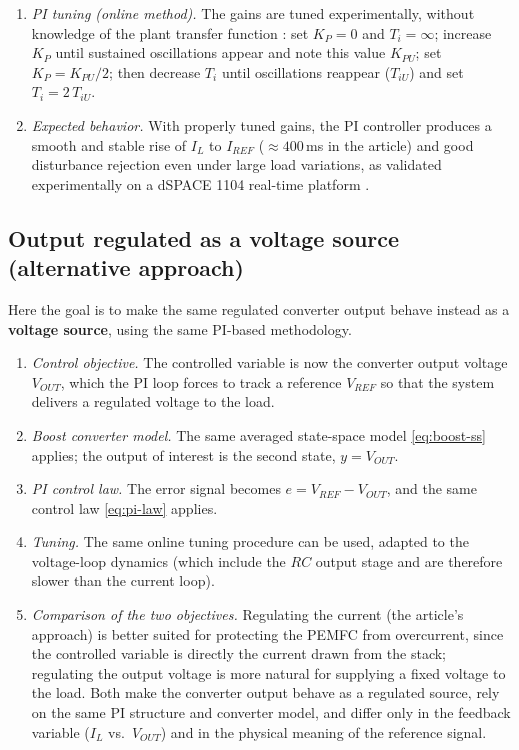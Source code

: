 \documentclass[11pt,a4paper]{article}
\begin{document}
\begin{enumerate}[itemsep=2pt]
          are too aggressive.
    \item \emph{PI tuning (online method).} The gains are tuned experimentally,
          without knowledge of the plant transfer function \cite{derbeli2017}:
          set $K_P=0$ and $T_i=\infty$; increase $K_P$ until sustained
          oscillations appear and note this value $K_{PU}$; set
          $K_P = K_{PU}/2$; then decrease $T_i$ until oscillations reappear
          ($T_{iU}$) and set $T_i = 2\,T_{iU}$.
    \item \emph{Expected behavior.} With properly tuned gains, the PI controller
          produces a smooth and stable rise of $I_L$ to $I_{REF}$
          ($\approx 400$\,ms in the article) and good disturbance rejection even
          under large load variations, as validated experimentally on a dSPACE
          1104 real-time platform \cite{derbeli2017}.
\end{enumerate}

\subsection{Output regulated as a voltage source (alternative approach)}
\label{sec:control-voltage}

Here the goal is to make the same regulated converter output behave instead as a
\textbf{voltage source}, using the same PI-based methodology.

\begin{enumerate}[itemsep=2pt]
    \item \emph{Control objective.} The controlled variable is now the converter
          output voltage $V_{OUT}$, which the PI loop forces to track a reference
          $V_{REF}$ so that the system delivers a regulated voltage to the load.
    \item \emph{Boost converter model.} The same averaged state-space model
          \eqref{eq:boost-ss} applies; the output of interest is the second
          state, $y = V_{OUT}$.
    \item \emph{PI control law.} The error signal becomes
          $e = V_{REF} - V_{OUT}$, and the same control law \eqref{eq:pi-law}
          applies.
    \item \emph{Tuning.} The same online tuning procedure can be used, adapted
          to the voltage-loop dynamics (which include the $RC$ output stage and
          are therefore slower than the current loop).
    \item \emph{Comparison of the two objectives.} Regulating the current (the
          article's approach) is better suited for protecting the PEMFC from
          overcurrent, since the controlled variable is directly the current
          drawn from the stack; regulating the output voltage is more natural for
          supplying a fixed voltage to the load. Both make the converter output
          behave as a regulated source, rely on the same PI structure and
          converter model, and differ only in the feedback variable
          ($I_L$ vs.\ $V_{OUT}$) and in the physical meaning of the reference
          signal.
\end{enumerate}
\end{document}
